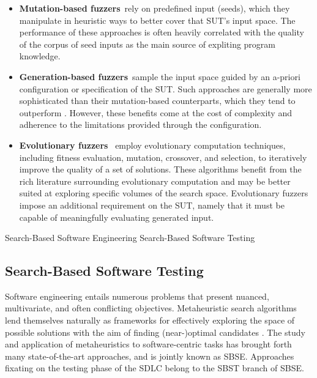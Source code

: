 \begin{itemize}
\item \textbf{Mutation-based fuzzers}~rely on predefined input (seeds),
which they manipulate in heuristic ways to better cover that \gls{SUT}'s input space.
The performance of these approaches is often heavily correlated
with the quality of the corpus of seed inputs as the main source
of expliting program knowledge.


\item \textbf{Generation-based fuzzers}~sample the input space
guided by an a-priori configuration or specification of the \gls{SUT}.
Such approaches are generally more sophisticated than their mutation-based
counterparts, which they tend to outperform \cite{saavedra2019review}.
However, these benefits come at the cost of complexity and
adherence to the limitations provided through the configuration.

\item \textbf{Evolutionary fuzzers}~ employ evolutionary computation
techniques, including fitness evaluation, mutation, crossover, and selection,
to iteratively improve the quality of a set of solutions.
These algorithms benefit from the rich literature surrounding
evolutionary computation and may be better suited at exploring
specific volumes of the search space.
Evolutionary fuzzers impose an additional requirement on the \gls{SUT},
namely that it must be capable of meaningfully evaluating generated input.
\end{itemize}

 {Search-Based Software Engineering}
 {Search-Based Software Testing}

\subsection{Search-Based Software Testing}

Software engineering entails numerous problems that present
nuanced, multivariate, and often conflicting objectives.
Metaheuristic search algorithms lend themselves naturally
as frameworks for effectively exploring the space of possible
solutions with the aim of finding (near-)optimal candidates \cite{harman2001search}.
The study and application of metaheuristics to software-centric tasks
has brought forth many state-of-the-art approaches, and is jointly known
as \Gls{SBSE}.
Approaches fixating on the testing phase of the \gls{SDLC}
belong to the \gls{SBST} branch of \gls{SBSE}.

